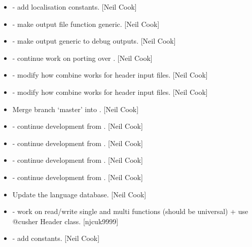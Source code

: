 \documentclass[a4paper,10pt,english]{report}
\begin{document}
\begin{itemize}
\item {} 
 - add localisation constants. {[}Neil
Cook{]}

\item {} 
 - make output file function generic. {[}Neil Cook{]}

\item {} 
 - make  output generic to debug outputs.
{[}Neil Cook{]}

\item {} 
 - continue work on porting over . {[}Neil Cook{]}

\item {} 
 - modify how combine works for header input files.
{[}Neil Cook{]}

\item {} 
 - modify how combine works for header input
files. {[}Neil Cook{]}

\item {} 
Merge branch ‘master’ into . {[}Neil Cook{]}

\item {} 
 - continue development from . {[}Neil Cook{]}

\item {} 
 - continue development from . {[}Neil Cook{]}

\item {} 
 - continue development from . {[}Neil Cook{]}

\item {} 
 - continue development from . {[}Neil Cook{]}

\item {} 
Update the language database. {[}Neil Cook{]}

\item {} 
 - work on read/write single and multi functions (should be
universal) + use @cusher Header class. {[}njcuk9999{]}

\item {} 
 - add  constants. {[}Neil Cook{]}


\end{itemize}
\end{document}
